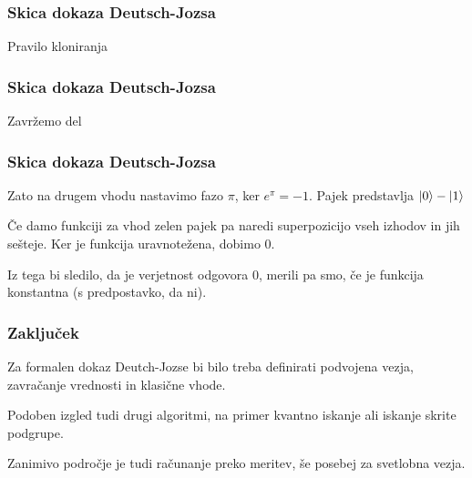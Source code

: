 \documentclass[10pt]{beamer}
\begin{document}
\begin{frame}
  \frametitle{Skica dokaza Deutsch-Jozsa}
  Pravilo kloniranja
  \begin{center}
  \end{center}
\end{frame}
\begin{frame}
  \frametitle{Skica dokaza Deutsch-Jozsa}
  Zavržemo del
  \begin{center}
  \end{center}
\end{frame}
\begin{frame}
  \frametitle{Skica dokaza Deutsch-Jozsa}
   Zato na drugem vhodu nastavimo fazo \(\pi\), ker \(e^\pi=-1\). Pajek predstavlja \(\ket0 - \ket 1\)
  \begin{center}
  \end{center} 
  Če damo funkciji za vhod zelen pajek pa naredi superpozicijo vseh izhodov in jih sešteje. Ker je funkcija uravnotežena, dobimo \(0\).

  Iz tega bi sledilo, da je verjetnost odgovora 0, merili pa smo, če je funkcija konstantna (s predpostavko, da ni).
\end{frame}
\begin{frame}
  \frametitle{Zaključek}
  Za formalen dokaz Deutch-Jozse bi bilo treba definirati podvojena vezja, zavračanje vrednosti in klasične vhode.

  Podoben izgled tudi drugi algoritmi, na primer kvantno iskanje ali iskanje skrite podgrupe.

  Zanimivo področje je tudi računanje preko meritev, še posebej za svetlobna vezja.
\end{frame}
\end{document}
